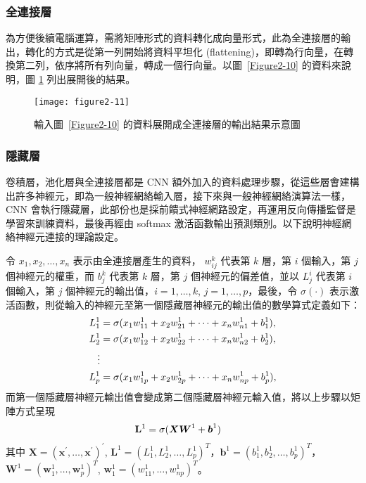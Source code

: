 \documentclass[12pt, a4paper]{article} 				%
\begin{document}
\subsubsection{全連接層}
為方便後續電腦運算，需將矩陣形式的資料轉化成向量形式，此為全連接層的輸出，轉化的方式是從第一列開始將資料平坦化 (flattening)，即轉為行向量，在轉換第二列，依序將所有列向量，轉成一個行向量。以圖~\ref{Figure2-10} 的資料來說明，圖 \ref{Figure2-11} 列出展開後的結果。

\begin{figure}[!ht]
\begin{center}
\texttt{[image: figure2-11]}
\caption{輸入圖~\ref{Figure2-10} 的資料展開成全連接層的輸出結果示意圖}\label{Figure2-11}
\end{center}
\end{figure}

\subsubsection{隱藏層}
卷積層，池化層與全連接層都是 CNN 額外加入的資料處理步驟，從這些層會建構出許多神經元，即為一般神經網絡輸入層，接下來與一般神經網絡演算法一樣， CNN 會執行隱藏層，此部份也是採前饋式神經網路設定，再運用反向傳播監督是學習來訓練資料，最後再經由 softmax 激活函數輸出預測類別。以下說明神經網絡神經元連接的理論設定。

令 $x_1,x_2,\ldots,x_n$ 表示由全連接層產生的資料， $w_{ij}^k$ 代表第 $k$ 層，第 $i$ 個輸入，第 $j$ 個神經元的權重，而 $b_{j}^k$ 代表第 $k$ 層，第 $j$ 個神經元的偏差值，並以 $L_{j}^i$ 代表第 $i$ 個輸入，第 $j$ 個神經元的輸出值，$i=1,…, k$, $j=1, …, p$，最後，令  $\sigma(\cdot)$ 表示激活函數，則從輸入的神經元至第一個隱藏層神經元的輸出值的數學算式定義如下：
\begin{align}
L_1^1&=\sigma(x_1w_{11}^1+x_2w_{21}^1+\cdots+x_nw_{n1}^1+b_1^1),\label{Eq2-1}\\
L_2^1&=\sigma(x_1w_{12}^1+x_2w_{22}^1+\cdots+x_nw_{n2}^1+b_2^1),\label{Eq2-2}\\
\vdots\notag\\
L_p^1&=\sigma(x_1w_{1p}^1+x_2w_{2p}^1+\cdots+x_nw_{np}^1+b_p^1),\label{Eq2-3}
\end{align}
而第一個隱藏層神經元輸出值會變成第二個隱藏層神經元輸入值，將以上步驟以矩陣方式呈現
\begin{align*}
{\bf L}^1&=\sigma(\boldsymbol{X}\boldsymbol{W}^1+\boldsymbol{b}^1)
\end{align*}
其中 $\boldsymbol{X}=(\boldsymbol{x}^{'},\ldots,\boldsymbol{x}^{'})^{'}$, $\boldsymbol{L}^1=(L_1^1,L_2^1,\ldots,L_p^1)^{T}$，$\boldsymbol{b}^1=(b_1^1,b_2^1,\ldots,b_p^1)^{T}$，$\boldsymbol{W}^1=(\boldsymbol{w}_{1}^{1}, \ldots, \boldsymbol{w}_{p}^{1})^{T}$, $\boldsymbol{w}_{1}^{1}=(w_{11}^{1},\ldots, w_{np}^{1})^{T}$。
\end{document}

